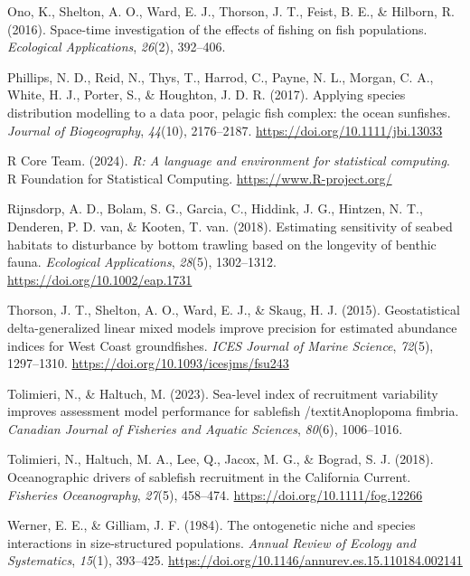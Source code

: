 \documentclass[
]{article}
\newlength{\cslhangindent}
\newlength{\cslentryspacingunit} %
\newenvironment{CSLReferences}[2] %
 {%
  \setlength{\parindent}{0pt}
  \ifodd #1
  \let\oldpar\par
  \def\par{\hangindent=\cslhangindent\oldpar}
  \fi
  \setlength{\parskip}{#2\cslentryspacingunit}
 }%
 {}
\begin{document}
\begin{CSLReferences}{1}{0}
\leavevmode{}%
Ono, K., Shelton, A. O., Ward, E. J., Thorson, J. T., Feist, B. E., \&
Hilborn, R. (2016). {Space-time investigation of the effects of fishing
on fish populations}. \emph{Ecological Applications}, \emph{26}(2),
392--406.

\leavevmode{}%
Phillips, N. D., Reid, N., Thys, T., Harrod, C., Payne, N. L., Morgan,
C. A., White, H. J., Porter, S., \& Houghton, J. D. R. (2017). {Applying
species distribution modelling to a data poor, pelagic fish complex: the
ocean sunfishes}. \emph{Journal of Biogeography}, \emph{44}(10),
2176--2187. \url{https://doi.org/10.1111/jbi.13033}

\leavevmode{}%
R Core Team. (2024). \emph{{R: A language and environment for
statistical computing}}. R Foundation for Statistical Computing.
\url{https://www.R-project.org/}

\leavevmode{}%
Rijnsdorp, A. D., Bolam, S. G., Garcia, C., Hiddink, J. G., Hintzen, N.
T., Denderen, P. D. van, \& Kooten, T. van. (2018). {Estimating
sensitivity of seabed habitats to disturbance by bottom trawling based
on the longevity of benthic fauna}. \emph{Ecological Applications},
\emph{28}(5), 1302--1312. \url{https://doi.org/10.1002/eap.1731}

\leavevmode{}%
Thorson, J. T., Shelton, A. O., Ward, E. J., \& Skaug, H. J. (2015).
{Geostatistical delta-generalized linear mixed models improve precision
for estimated abundance indices for West Coast groundfishes}. \emph{ICES
Journal of Marine Science}, \emph{72}(5), 1297--1310.
\url{https://doi.org/10.1093/icesjms/fsu243}

\leavevmode{}%
Tolimieri, N., \& Haltuch, M. (2023). {Sea-level index of recruitment
variability improves assessment model performance for sablefish
/textit{Anoplopoma fimbria}}. \emph{Canadian Journal of Fisheries and
Aquatic Sciences}, \emph{80}(6), 1006--1016.

\leavevmode{}%
Tolimieri, N., Haltuch, M. A., Lee, Q., Jacox, M. G., \& Bograd, S. J.
(2018). {Oceanographic drivers of sablefish recruitment in the
California Current}. \emph{Fisheries Oceanography}, \emph{27}(5),
458--474. \url{https://doi.org/10.1111/fog.12266}

\leavevmode{}%
Werner, E. E., \& Gilliam, J. F. (1984). {The ontogenetic niche and
species interactions in size-structured populations}. \emph{Annual
Review of Ecology and Systematics}, \emph{15}(1), 393--425.
\url{https://doi.org/10.1146/annurev.es.15.110184.002141}

\end{CSLReferences}
\end{document}
